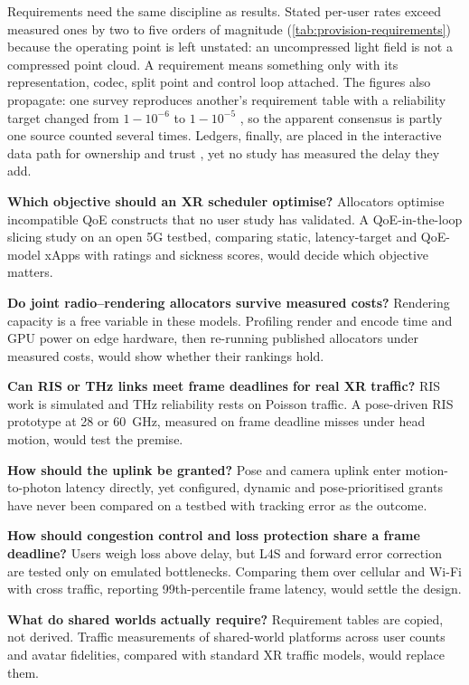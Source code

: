 Requirements need the same discipline as results. Stated per-user rates exceed measured ones by two to
five orders of magnitude (\cref{tab:provision-requirements}) because the operating point is left
unstated: an uncompressed light field is not a compressed point cloud. A requirement means something
only with its representation, codec, split point and control loop attached. The figures also propagate:
one survey reproduces another's requirement table with a reliability target changed from $1-10^{-6}$ to
$1-10^{-5}$ \cite{W4390204075,W4312940001}, so the apparent consensus is partly one source counted
several times. Ledgers, finally, are placed in the interactive data path for ownership and trust
\cite{W4224330100,W4312940001}, yet no study has measured the delay they add.

\begin{openproblems}
\item \textbf{Which objective should an XR scheduler optimise?} Allocators optimise incompatible QoE
  constructs that no user study has validated. A QoE-in-the-loop slicing study on an open 5G testbed,
  comparing static, latency-target and QoE-model xApps with ratings and sickness scores, would decide
  which objective matters.
\item \textbf{Do joint radio--rendering allocators survive measured costs?} Rendering capacity is a
  free variable in these models. Profiling render and encode time and GPU power on edge hardware, then
  re-running published allocators under measured costs, would show whether their rankings hold.
\item \textbf{Can RIS or THz links meet frame deadlines for real XR traffic?} RIS work is simulated and
  THz reliability rests on Poisson traffic. A pose-driven RIS prototype at 28 or 60~GHz, measured on frame
  deadline misses under head motion, would test the premise.
\item \textbf{How should the uplink be granted?} Pose and camera uplink enter motion-to-photon latency
  directly, yet configured, dynamic and pose-prioritised grants have never been compared on a testbed
  with tracking error as the outcome.
\item \textbf{How should congestion control and loss protection share a frame deadline?} Users weigh
  loss above delay, but L4S and forward error correction are tested only on emulated bottlenecks.
  Comparing them over cellular and Wi-Fi with cross traffic, reporting 99th-percentile frame latency,
  would settle the design.
\item \textbf{What do shared worlds actually require?} Requirement tables are copied, not derived.
  Traffic measurements of shared-world platforms across user counts and avatar fidelities, compared with
  standard XR traffic models, would replace them.
\end{openproblems}

